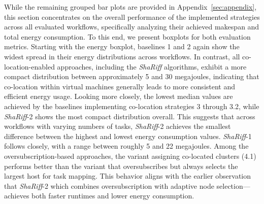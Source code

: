 
While the remaining grouped bar plots are provided in Appendix~\ref{sec:appendix}, this section concentrates on the overall performance of the implemented strategies across all evaluated workflows, specifically analyzing their achieved makespan and total energy consumption. To this end, we present boxplots for both evaluation metrics.
Starting with the energy boxplot, baselines 1 and 2 again show the widest spread in their energy distributions across workflows. In contrast, all co-location-enabled approaches, including the \textit{ShaRiff} algorithms, exhibit a more compact distribution between approximately 5 and 30 megajoules, indicating that co-location within virtual machines generally leads to more consistent and efficient energy usage. Looking more closely, the lowest median values are achieved by the baselines implementing co-location strategies 3 through 3.2, while \textit{ShaRiff}-2 shows the most compact distribution overall. This suggests that across workflows with varying numbers of tasks, \textit{ShaRiff}-2 achieves the smallest difference between the highest and lowest energy consumption values. \textit{ShaRiff}-1 follows closely, with a range between roughly 5 and 22 megajoules. Among the oversubscription-based approaches, the variant assigning co-located clusters (4.1) performs better than the variant that oversubscribes but always selects the largest host for task mapping. This behavior aligns with the earlier observation that \textit{ShaRiff}-2 which combines oversubscription with adaptive node selection—achieves both faster runtimes and lower energy consumption.

